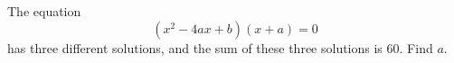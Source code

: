 The equation
\[\left(x^2-4ax+b\right)(x+a)=0\]
has three different solutions, and the sum of these three solutions is $60$. Find $a$.
